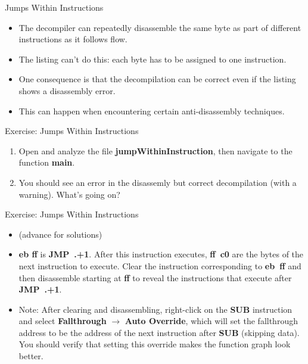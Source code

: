 \documentclass{beamer}
\begin{document}
\begin{frame}
\begin{block}{Jumps Within Instructions}
\begin{itemize}
\item The decompiler can repeatedly disassemble the same byte as part of different instructions as it follows flow.
\item The listing can't do this: each byte has to be assigned to one instruction.
\item One consequence is that the decompilation can be correct even if the listing shows a disassembly error.
\item This can happen when encountering certain anti-disassembly techniques.
\end{itemize}
\end{block}
\end{frame}

\begin{frame}
\begin{block}{Exercise: Jumps Within Instructions}
\begin{enumerate}
\item Open and analyze the file \textbf{jumpWithinInstruction}, then navigate to the function \textbf{main}.
\item You should see an error in the disassemly but correct decompilation (with a warning).  What's going on?
\end{enumerate}
\end{block}
\end{frame}

\begin{frame}
\begin{block}{Exercise: Jumps Within Instructions}
\begin{itemize}
\item[] (advance for solutions)
\pause
\item \textbf{eb ff} is \textbf{JMP~.+1}.  After this instruction executes, \textbf{ff~c0} are the bytes of the next instruction to execute.  Clear the
instruction corresponding to \textbf{eb~ff} and then disassemble starting at \textbf{ff} to reveal the instructions that execute after \textbf{JMP~.+1}.
\item Note: After clearing and disassembling, right-click on the \textbf{SUB} instruction and select \textbf{Fallthrough} $\rightarrow$ \textbf{Auto Override}, which
will set the fallthrough address to be the address of the next instruction after \textbf{SUB} (skipping data).  You should verify that setting this override makes
the function graph look better.
\end{itemize}
\end{block}
\end{frame}
\end{document}
